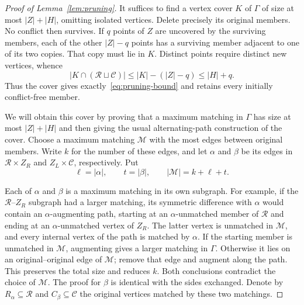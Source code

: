 \documentclass[11pt]{article}
\theoremstyle{remark}
\newcommand{\abs}[1]{\lvert #1\rvert}
\begin{document}
\begin{proof}[Proof of Lemma~\ref{lem:pruning}]
It suffices to find a vertex cover $K$ of $\Gamma$ of size at most
$\abs Z+\abs H$, omitting isolated vertices.  Delete precisely its
original members.  No conflict then survives.  If $q$ points of $Z$ are
uncovered by the surviving members, each of the other $\abs Z-q$ points
has a surviving member adjacent to one of its two copies.  That copy
must lie in $K$.  Distinct points require distinct new vertices, whence
\begin{equation}\label{eq:cover-charge}
 \abs{K\cap(\mathcal R\sqcup\mathcal C)}
 \leq \abs K-(\abs Z-q)\leq\abs H+q.
\end{equation}
Thus the cover gives exactly~\eqref{eq:pruning-bound} and retains every
initially conflict-free member.

We will obtain this cover by proving that a maximum matching in $\Gamma$
has size at most $\abs Z+\abs H$ and then giving the usual alternating-path
construction of the cover.  Choose a maximum matching $\mathcal M$ with
the most edges between original members.  Write $k$ for the number of
these edges, and let $\alpha$ and $\beta$ be its edges in
$\mathcal R\times Z_R$ and $Z_L\times\mathcal C$, respectively.  Put
\[
 \ell=\abs\alpha,\qquad t=\abs\beta,
 \qquad\abs{\mathcal M}=k+\ell+t.
\]

Each of $\alpha$ and $\beta$ is a maximum matching in its own subgraph.
For example, if the $\mathcal R$--$Z_R$ subgraph had a larger matching,
its symmetric difference with $\alpha$ would contain an
$\alpha$-augmenting path, starting at an $\alpha$-unmatched member of
$\mathcal R$ and ending at an $\alpha$-unmatched vertex of $Z_R$.
The latter vertex is unmatched in $\mathcal M$, and every internal vertex
of the path is matched by $\alpha$.  If the starting member is unmatched
in $\mathcal M$, augmenting gives a larger matching in $\Gamma$.
Otherwise it lies on an original--original edge of $\mathcal M$;
remove that edge and augment along the path.  This preserves the total
size and reduces $k$.  Both conclusions contradict the choice of
$\mathcal M$.  The proof for $\beta$ is identical with the sides
exchanged.  Denote by $R_\alpha\subseteq\mathcal R$ and
$C_\beta\subseteq\mathcal C$ the original vertices matched by these
two matchings.


\end{proof}
\end{document}
